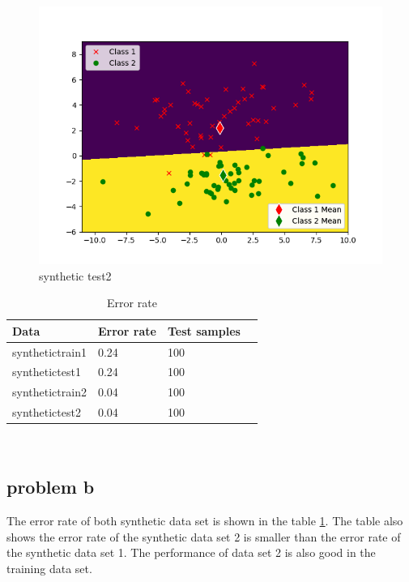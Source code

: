\documentclass{article}
\begin{document}
	\begin{figure}[hbt!]
		\includegraphics[width=\linewidth]{images/synthetic_test2.png}
		\caption{synthetic test2}
		\label{fig:synthetictest2}
	\end{figure}
		\begin{table}[hbt!]
		\begin{center}
		\begin{tabular}{| l | l | l | p{5cm} |}
		\hline
			Data      & Error rate & Test samples  \\ \hline
			synthetictrain1& 0.24        & 100    \\  \hline
			synthetictest1& 0.24		& 100    \\   \hline
			synthetictrain2& 0.04        & 100    \\  \hline
			synthetictest2& 0.04		& 100    \\   \hline
		\end{tabular}
		\end{center}
	\caption{Error rate}
	\label{table: errorrate}
	\end{table}
	 \\
	\subsection{problem b}
	The error rate of both synthetic data set is shown in the table \ref{table: errorrate}. The table also shows the error rate of the synthetic data set 2 is smaller than the error rate of the synthetic data set 1. The performance of data set 2 is also good in the training data set. 
\end{document}
